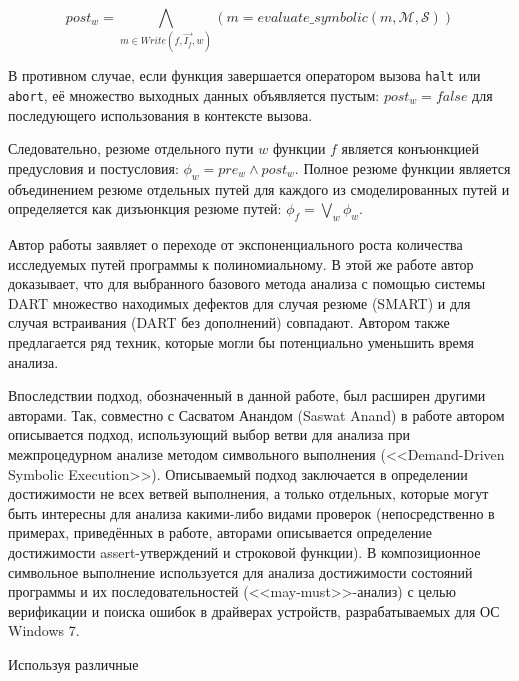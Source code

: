 \begin{equation*}
 post_w = \bigwedge_{m \in Write(f, \overrightarrow{I_f}, w)}(m = evaluate\_symbolic(m, \mathcal{M}, \mathcal{S}))
\end{equation*}

В противном случае, если функция завершается оператором вызова \texttt{halt} или \texttt{abort}, её множество выходных данных объявляется пустым: $post_w = false$ для последующего использования в контексте вызова.

Следовательно, резюме отдельного пути $w$ функции $f$ является конъюнкцией предусловия и постусловия: $\phi_w = pre_w \wedge post_w$. Полное резюме функции является объединением резюме отдельных путей для каждого из смоделированных путей и определяется как дизъюнкция резюме путей: $\phi_f = \bigvee_w \phi_w$.

Автор работы заявляет о переходе от экспоненциального роста количества исследуемых путей программы к полиномиальному. В этой же работе автор доказывает, что для выбранного базового метода анализа с помощью системы DART множество находимых дефектов для случая резюме (SMART) и для случая встраивания (DART без дополнений) совпадают. Автором также предлагается ряд техник, которые могли бы потенциально уменьшить время анализа.

Впоследствии подход, обозначенный в данной работе, был расширен другими авторами. Так, совместно с Сасватом Анандом (Saswat Anand) в работе \cite{anand-godefroid} автором описывается подход, использующий выбор ветви для анализа при межпроцедурном анализе методом символьного выполнения (<<Demand-Driven Symbolic Execution>>). Описываемый подход заключается в определении достижимости не всех ветвей выполнения, а только отдельных, которые могут быть интересны для анализа какими-либо видами проверок (непосредственно в примерах, приведённых в работе, авторами описывается определение достижимости assert-утверждений и строковой функции). В \cite{may-must} композиционное символьное выполнение используется для анализа достижимости состояний программы и их последовательностей (<<may-must>>-анализ) с целью верификации и поиска ошибок в драйверах устройств, разрабатываемых для ОС Windows 7. 

Используя различные 

